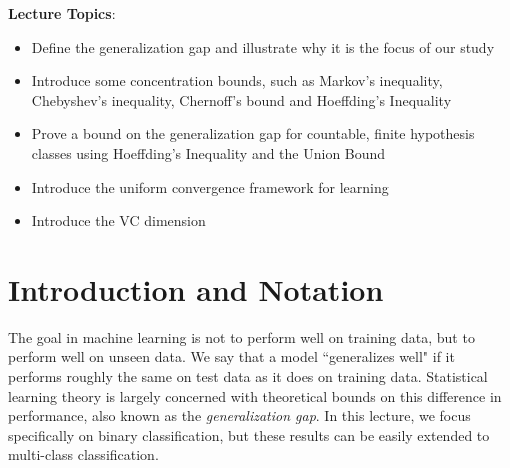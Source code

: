 \documentclass{article}
\begin{document}
\textbf{Lecture Topics}:
\begin{itemize}
    
    \item
    Define the generalization gap and illustrate why it is the focus of our study
    
    \item 
    Introduce some concentration bounds, such as Markov's inequality, Chebyshev's inequality, Chernoff's bound and Hoeffding's Inequality
    
    \item
    Prove a bound on the generalization gap for countable, finite hypothesis classes using Hoeffding's Inequality and the Union Bound
    
    \item
    Introduce the uniform convergence framework for learning
    
    \item
    Introduce the VC dimension 
    
\end{itemize}

\section{Introduction and Notation}

The goal in machine learning is not to perform well on training data, but to perform well on unseen data. We say that a model ``generalizes well" if it performs roughly the same on test data as it does on training data. Statistical learning theory is largely concerned with theoretical bounds on this difference in performance, also known as the \emph{generalization gap}. In this lecture, we focus specifically on binary classification, but these results can be easily extended to multi-class classification.
\end{document}
